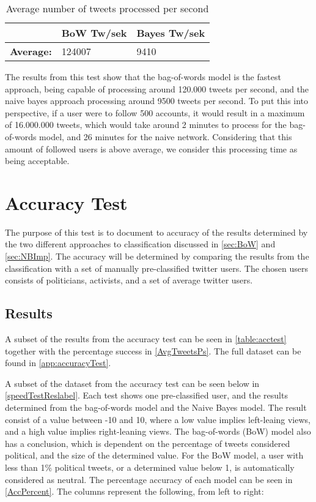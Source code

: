 \begin{table}[H]\centering
\begin{tabular}{|l|l|l|}\hline
					&	\textbf{BoW Tw/sek}	&	\textbf{Bayes Tw/sek}	\\\hline
\textbf{Average:}	&	124007				&	9410 					\\\hline	
\end{tabular}
\caption{Average number of tweets processed per second}
\label{AvgTweetsPs}
\end{table}

The results from this test show that the bag-of-words model is the fastest
approach, being capable of processing around 120.000 tweets per second, and the
naive bayes approach processing around 9500 tweets per second. To put this into
perspective, if a user were to follow 500 accounts, it would result in a maximum
of 16.000.000 tweets, which would take around 2 minutes to process for the
bag-of-words model, and 26 minutes for the naive network. Considering that this
amount of followed users is above average, we consider this processing time as
being acceptable.

\section{Accuracy Test}
The purpose of this test is to document to accuracy of the results determined
by the two different approaches to classification discussed in \autoref{sec:BoW}
and \autoref{sec:NBImp}. The accuracy will be determined by comparing the
results from the classification with a set of manually pre-classified
twitter users. The chosen users consists of politicians, activists, and a set of
average twitter users.

\subsection*{Results}
A subset of the results from the accuracy test can be seen in
\autoref{table:acctest} together with the percentage success in
\autoref{AvgTweetsPs}. The full dataset can be found in
\autoref{app:accuracyTest}.\nl

A subset of the dataset from the accuracy test can be seen below in
\autoref{speedTestReslabel}. Each test shows one pre-classified user, and the
results determined from the bag-of-words model and the Naive Bayes model. The
result consist of a value between -10 and 10, where a low value implies
left-leaing views, and a high value implies right-leaning views. The
bag-of-words (BoW) model also has a conclusion, which is dependent on the
percentage of tweets considered political, and the size of the determined value.
For the BoW model, a user with less than 1\% political tweets, or a determined
value below 1, is automatically considered as neutral. The percentage accuracy
of each model can be seen in \autoref{AccPercent}.
The columns represent the following, from left to right:\nl

